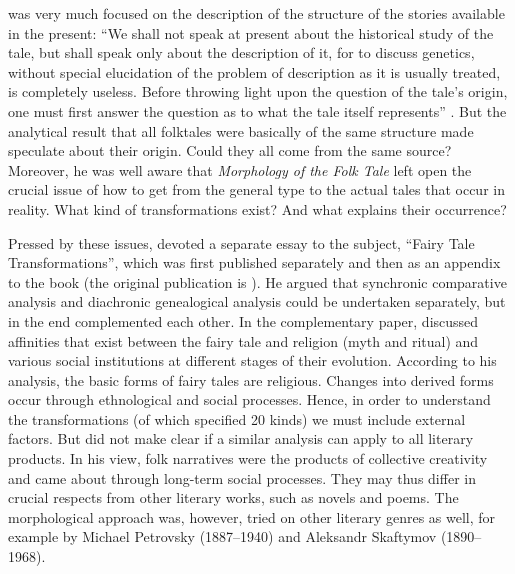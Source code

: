 \documentclass[output=paper]{langscibook}
\begin{document}
{\Propp} was very much focused on the description of the structure of the stories available in the present: ``We shall not speak at present about the historical study of the tale, but shall speak only about the description of it, for to discuss genetics, without special elucidation of the problem of description as it is usually treated, is completely useless. Before throwing light upon the question of the tale's origin, one must first answer the question as to what the tale itself represents'' \citep[5]{Propp1968}. But the analytical result that all folktales were basically of the same structure made {\Propp} speculate about their origin. Could they all come from the same source? Moreover, he was well aware that \emph{Morphology of the Folk Tale} left open the crucial issue of how to get from the general type to the actual tales that occur in reality. What kind of transformations exist? And what explains their occurrence? 

Pressed by these issues, {\Propp} devoted a separate essay to the subject, ``Fairy Tale Transformations'', which was first published separately and then as an appendix to the book (the original publication is \citealt{Propp1928}). He argued that synchronic comparative analysis and diachronic genealogical analysis could be undertaken separately, but in the end complemented each other. In the complementary paper, {\Propp} discussed affinities that exist between the fairy tale and religion (myth and ritual) and various social institutions at different stages of their evolution. According to his analysis, the basic forms of fairy tales are religious. Changes into derived forms occur through ethnological and social processes. Hence, in order to understand the transformations (of which {\Propp} specified 20 kinds) we must include external factors. But {\Propp} did not make clear if a similar analysis can apply to all literary products. In his view, folk narratives were the products of collective creativity and came about through long-term social processes. They may thus differ in crucial respects from other literary works, such as novels and poems. The morphological approach was, however, tried on other literary genres as well, for example by Michael Petrovsky (1887--1940) and Aleksandr Skaftymov (1890--1968).  
\end{document}
